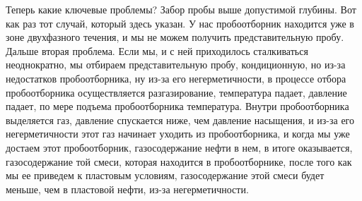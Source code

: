 \documentclass[main.tex]{subfiles}
\begin{document}
Теперь какие ключевые проблемы?
Забор пробы выше допустимой глубины.
Вот как раз тот случай, который здесь указан.
У нас пробоотборник находится уже в зоне двухфазного течения, и мы не можем получить представительную пробу.
Дальше вторая проблема.
Если мы, и с ней приходилось сталкиваться неоднократно, мы отбираем представительную пробу, кондиционную, но из-за недостатков пробоотборника, ну из-за его негерметичности, в процессе отбора пробоотборника осуществляется разгазирование, температура падает, давление падает, по мере подъема пробоотборника температура.
Внутри пробоотборника выделяется газ, давление спускается ниже, чем давление насыщения, и из-за его негерметичности этот газ начинает уходить из пробоотборника, и когда мы уже достаем этот пробоотборник, газосодержание нефти в нем, в итоге оказывается, газосодержание той смеси, которая находится в пробоотборнике, после того как мы ее приведем к пластовым условиям, газосодержание этой смеси будет меньше, чем в пластовой нефти, из-за негерметичности.
\end{document}
